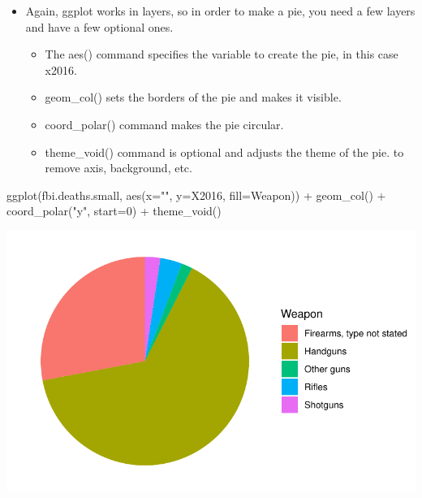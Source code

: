 \documentclass[
  letterpaper,
  DIV=11,
  numbers=noendperiod]{scrreprt}
\newenvironment{Shaded}{\begin{snugshade}}{\end{snugshade}}
\newcommand{\AttributeTok}[1]{\textcolor[rgb]{0.40,0.45,0.13}{#1}}
\newcommand{\DecValTok}[1]{\textcolor[rgb]{0.68,0.00,0.00}{#1}}
\newcommand{\FunctionTok}[1]{\textcolor[rgb]{0.28,0.35,0.67}{#1}}
\newcommand{\NormalTok}[1]{\textcolor[rgb]{0.00,0.23,0.31}{#1}}
\newcommand{\SpecialCharTok}[1]{\textcolor[rgb]{0.37,0.37,0.37}{#1}}
\newcommand{\StringTok}[1]{\textcolor[rgb]{0.13,0.47,0.30}{#1}}
\providecommand{\tightlist}{%
  \setlength{\itemsep}{0pt}\setlength{\parskip}{0pt}}\usepackage{longtable,booktabs,array}
\begin{document}
\begin{itemize}
\tightlist
\item
  Again, ggplot works in layers, so in order to make a pie, you need a
  few layers and have a few optional ones.

  \begin{itemize}
  \tightlist
  \item
    The aes() command specifies the variable to create the pie, in this
    case x2016.
  \item
    geom\_col() sets the borders of the pie and makes it visible.
  \item
    coord\_polar() command makes the pie circular.
  \item
    theme\_void() command is optional and adjusts the theme of the pie.
    to remove axis, background, etc.
  \end{itemize}
\end{itemize}

\begin{Shaded}
\begin{Highlighting}[]
\FunctionTok{ggplot}\NormalTok{(fbi.deaths.small, }\FunctionTok{aes}\NormalTok{(}\AttributeTok{x=}\StringTok{""}\NormalTok{, }\AttributeTok{y=}\NormalTok{X2016, }\AttributeTok{fill=}\NormalTok{Weapon)) }\SpecialCharTok{+}
  \FunctionTok{geom\_col}\NormalTok{() }\SpecialCharTok{+} 
  \FunctionTok{coord\_polar}\NormalTok{(}\StringTok{"y"}\NormalTok{, }\AttributeTok{start=}\DecValTok{0}\NormalTok{) }\SpecialCharTok{+} 
  \FunctionTok{theme\_void}\NormalTok{() }
\end{Highlighting}
\end{Shaded}

\includegraphics{dataviz_files/figure-pdf/unnamed-chunk-18-1.pdf}
\end{document}
